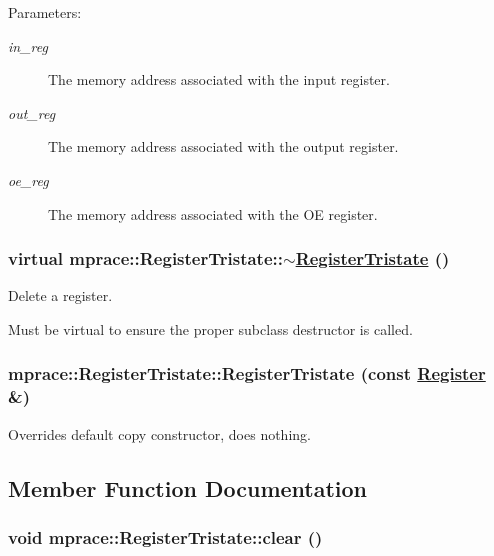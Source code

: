 \begin{Desc}
\item[Parameters:]
\begin{description}
\item[{\em in\_\-reg}]The memory address associated with the input register. \item[{\em out\_\-reg}]The memory address associated with the output register. \item[{\em oe\_\-reg}]The memory address associated with the OE register.\end{description}
\end{Desc}
\hypertarget{classmprace_1_1RegisterTristate_a1}{
\subsubsection[$\sim$RegisterTristate]{\setlength{\rightskip}{0pt plus 5cm}virtual mprace::Register\-Tristate::$\sim$\hyperlink{classmprace_1_1RegisterTristate}{Register\-Tristate} ()}}
\label{classmprace_1_1RegisterTristate_a1}


Delete a register. 

Must be virtual to ensure the proper subclass destructor is called.\hypertarget{classmprace_1_1RegisterTristate_b0}{
\subsubsection[RegisterTristate]{\setlength{\rightskip}{0pt plus 5cm}mprace::Register\-Tristate::Register\-Tristate (const \hyperlink{classmprace_1_1Register}{Register} \&)}}
\label{classmprace_1_1RegisterTristate_b0}


Overrides default copy constructor, does nothing. 



\subsection{Member Function Documentation}
\hypertarget{classmprace_1_1RegisterTristate_a7}{
\subsubsection[clear]{\setlength{\rightskip}{0pt plus 5cm}void mprace::Register\-Tristate::clear ()}}
\label{classmprace_1_1RegisterTristate_a7}



